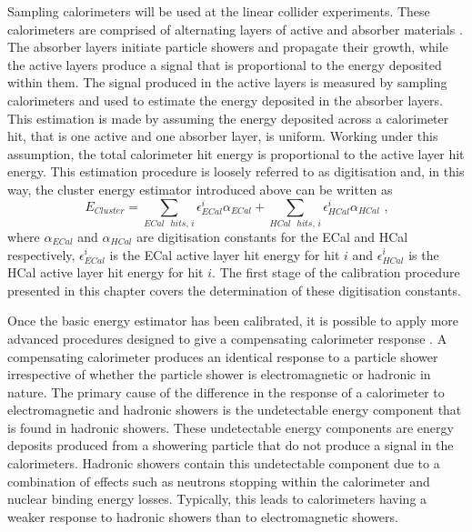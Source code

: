 Sampling calorimeters will be used at the linear collider experiments.  These calorimeters are comprised of alternating layers of active and absorber materials \cite{Fabjan:2003aq}.  The absorber layers initiate particle showers and propagate their growth, while the active layers produce a signal that is proportional to the energy deposited within them.  The signal produced in the active layers is measured by sampling calorimeters and used to estimate the energy deposited in the absorber layers.  This estimation is made by assuming the energy deposited across a calorimeter hit, that is one active and one absorber layer, is uniform.  Working under this assumption, the total calorimeter hit energy is proportional to the active layer hit energy.  This estimation procedure is loosely referred to as digitisation and, in this way, the cluster energy estimator introduced above can be written as
%
\begin{equation}
E_{Cluster} = \sum_{ECal \text{ } hits \text{, }i} \epsilon^{i}_{ECal} \alpha_{ECal} + \sum_{HCal \text{ } hits \text{, }i} \epsilon^{i}_{HCal} \alpha_{HCal} \text{ ,}
\end{equation}
%
\noindent where $\alpha_{ECal}$ and $\alpha_{HCal}$ are digitisation constants for the ECal and HCal respectively, $\epsilon^{i}_{ECal}$ is the ECal active layer hit energy for hit $i$ and $\epsilon^{i}_{HCal}$ is the HCal active layer hit energy for hit $i$.  The first stage of the calibration procedure presented in this chapter covers the determination of these digitisation constants.  

Once the basic energy estimator has been calibrated, it is possible to apply more advanced procedures designed to give a compensating calorimeter response \cite{arXiv:0907.3577}.  A compensating calorimeter produces an identical response to a particle shower irrespective of whether the particle shower is electromagnetic or hadronic in nature.  The primary cause of the difference in the response of a calorimeter to electromagnetic and hadronic showers is the undetectable energy component that is found in hadronic showers.  These undetectable energy components are energy deposits produced from a showering particle that do not produce a signal in the calorimeters.  Hadronic showers contain this undetectable component due to a combination of effects such as neutrons stopping within the calorimeter and nuclear binding energy losses.  Typically, this leads to calorimeters having a weaker response to hadronic showers than to electromagnetic showers.  

